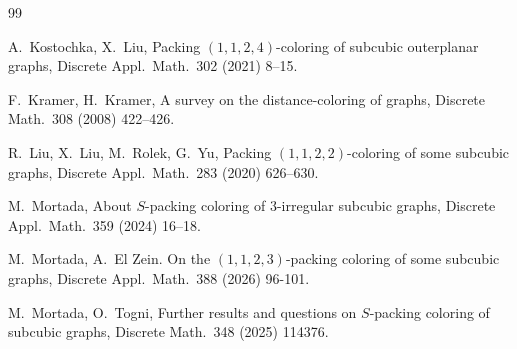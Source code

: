 \documentclass[12pt]{article}
\begin{document}
\begin{thebibliography}{99}

A.~Kostochka, X.~Liu,
Packing $(1,1,2,4)$-coloring of subcubic outerplanar graphs,
Discrete Appl.\ Math.\ 302 (2021) 8--15.



F.~Kramer, H.~Kramer,
A survey on the distance-coloring of graphs, Discrete Math.\ 308 (2008) 422--426.



R.~Liu, X.~Liu, M.~Rolek, G.~Yu,
Packing $(1,1,2,2)$-coloring of some subcubic graphs,
Discrete Appl.\ Math.\ 283 (2020) 626--630.



M.~Mortada,
About  $S$-packing coloring of $3$-irregular subcubic graphs,
Discrete Appl.\ Math.\ 359 (2024) 16--18.

M.~Mortada, A.~El Zein. 
On the $(1, 1, 2, 3)$-packing coloring of some subcubic graphs,
Discrete Appl.\ Math.\ 388 (2026) 96-101.


M.~Mortada, O.~Togni, 
Further results and questions on  $S$-packing coloring of subcubic graphs,
Discrete Math.\ 348 (2025) 114376.



\end{thebibliography}
\end{document}
